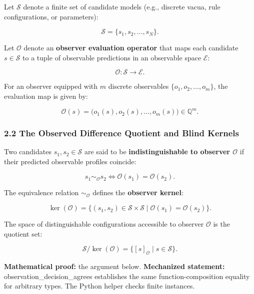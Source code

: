 \documentclass[
  10pt,
]{article}
\begin{document}
Let \hypertarget{math-E0012-0006}{}{\(\mathcal{S}\)} denote a finite set of candidate models (e.g., discrete vacua, rule configurations, or parameters):

\hypertarget{math-E0013-0007}{}{\[\mathcal{S} = \{s_1, s_2, \ldots, s_N\}.\]}

Let \hypertarget{math-E0014-0008}{}{\(\mathcal{O}\)} denote an \textbf{observer evaluation operator} that maps each candidate \hypertarget{math-E0015-0009}{}{\(s \in \mathcal{S}\)} to a tuple of observable predictions in an observable space \hypertarget{math-E0016-0010}{}{\(\mathcal{E}\)}:

\hypertarget{math-E0017-0011}{}{\[\mathcal{O}: \mathcal{S} \to \mathcal{E}.\]}

For an observer equipped with \hypertarget{math-E0018-0012}{}{\(m\)} discrete observables \hypertarget{math-E0019-0013}{}{\(\{o_1, o_2, \ldots, o_m\}\)}, the evaluation map is given by:

\hypertarget{math-E0020-0014}{}{\[\mathcal{O}(s) = \big(o_1(s), o_2(s), \ldots, o_m(s)\big) \in \mathbb{Q}^m.\]}

\subsubsection{2.2 The Observed Difference Quotient and Blind Kernels}\label{the-observed-difference-quotient-and-blind-kernels}

Two candidates \hypertarget{math-E0021-0015}{}{\(s_1, s_2 \in \mathcal{S}\)} are said to be \textbf{indistinguishable to observer \hypertarget{math-E0014-0016}{}{\(\mathcal{O}\)}} if their predicted observable profiles coincide:

\hypertarget{math-E0022-0017}{}{\[s_1 \sim_{\mathcal{O}} s_2 \iff \mathcal{O}(s_1) = \mathcal{O}(s_2).\]}

The equivalence relation \hypertarget{math-E0023-0018}{}{\(\sim_{\mathcal{O}}\)} defines the \textbf{observer kernel}:

\hypertarget{math-E0024-0019}{}{\[\ker(\mathcal{O}) = \{(s_1, s_2) \in \mathcal{S} \times \mathcal{S} \mid \mathcal{O}(s_1) = \mathcal{O}(s_2)\}.\]}

The space of distinguishable configurations accessible to observer \hypertarget{math-E0014-0020}{}{\(\mathcal{O}\)} is the quotient set:

\hypertarget{math-E0025-0021}{}{\[\mathcal{S} / \ker(\mathcal{O}) = \{[s]_{\mathcal{O}} \mid s \in \mathcal{S}\}.\]}

\textbf{Mathematical proof:} the argument below. \textbf{Mechanized statement:} observation\_decision\_agrees establishes the same function-composition equality for arbitrary types. The Python helper checks finite instances.
\end{document}
